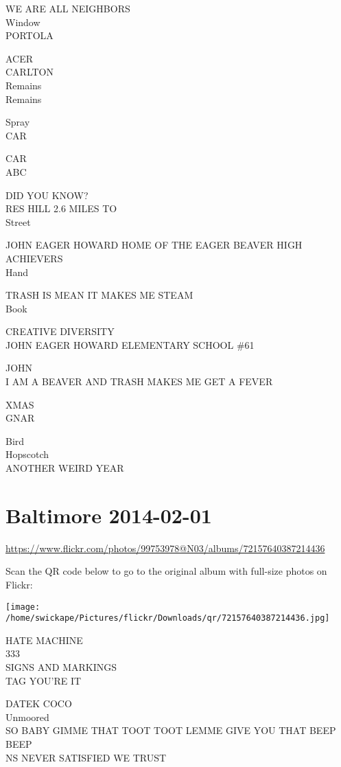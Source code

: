 \documentclass[10pt,letterpaper]{article}
\begin{document}
WE ARE ALL NEIGHBORS\\
Window\\
PORTOLA

ACER\\
CARLTON\\
Remains\\
Remains

Spray\\
CAR

CAR\\
ABC

DID YOU KNOW?\\
RES HILL 2.6 MILES TO\\
Street

JOHN EAGER HOWARD HOME OF THE EAGER BEAVER HIGH ACHIEVERS\\
Hand

TRASH IS MEAN IT MAKES ME STEAM\\
Book

CREATIVE DIVERSITY\\
JOHN EAGER HOWARD ELEMENTARY SCHOOL \#61

JOHN\\
I AM A BEAVER AND TRASH MAKES ME GET A FEVER

XMAS\\
GNAR

Bird\\
Hopscotch\\
ANOTHER WEIRD YEAR


\section*{Baltimore 2014-02-01}

\url{https://www.flickr.com/photos/99753978@N03/albums/72157640387214436}

Scan the QR code below to go to the original album with full-size photos on Flickr:

\texttt{[image: /home/swickape/Pictures/flickr/Downloads/qr/72157640387214436.jpg]}


HATE MACHINE\\
333\\
SIGNS AND MARKINGS\\
TAG YOU'RE IT

DATEK COCO\\
Unmoored\\
SO BABY GIMME THAT TOOT TOOT LEMME GIVE YOU THAT BEEP BEEP\\
NS NEVER SATISFIED WE TRUST
\end{document}

